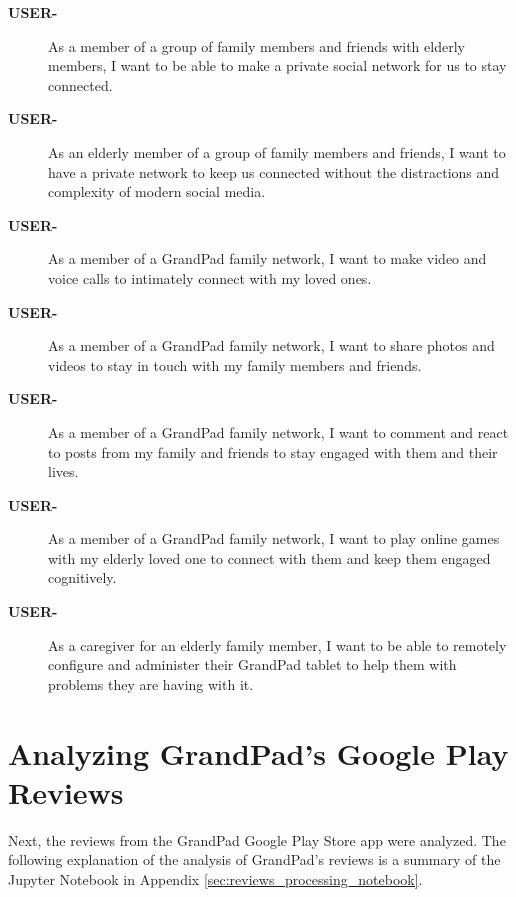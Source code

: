 \begin{description}
    \item[\textbf{USER-\showmycounter}]
        As a member of a group of family members and friends with elderly
            members, I want to be able to make a private social network for us
            to stay connected.
    \item[\textbf{USER-\showmycounter}]
        As an elderly member of a group of family members and friends, I want to
            have a private network to keep us connected without the distractions
            and complexity of modern social media.
    \item[\textbf{USER-\showmycounter}]
        As a member of a GrandPad family network, I want to make video and voice
            calls to intimately connect with my loved ones.
    \item[\textbf{USER-\showmycounter}]
        As a member of a GrandPad family network, I want to share photos and
            videos to stay in touch with my family members and friends.
    \item[\textbf{USER-\showmycounter}]
        As a member of a GrandPad family network, I want to comment and react to
            posts from my family and friends to stay engaged with them and their
            lives.
    \item[\textbf{USER-\showmycounter}]
        As a member of a GrandPad family network, I want to play online games
            with my elderly loved one to connect with them and keep them engaged
            cognitively.
    \item[\textbf{USER-\showmycounter}]
        As a caregiver for an elderly family member, I want to be able to
            remotely configure and administer their GrandPad tablet to help them
            with problems they are having with it.
\end{description}

\section*{Analyzing GrandPad's Google Play Reviews}

Next, the reviews from the GrandPad Google Play Store app were analyzed.
The following explanation of the analysis of GrandPad's reviews is a summary of
    the Jupyter Notebook in Appendix \ref{sec:reviews_processing_notebook}.

